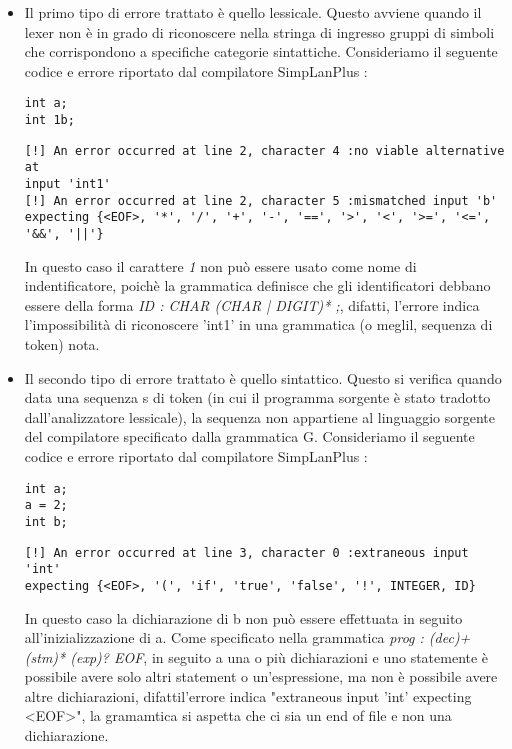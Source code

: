 \begin{itemize}
\item Il primo tipo di errore trattato è quello lessicale. Questo avviene quando il lexer non è in grado di riconoscere nella stringa di ingresso gruppi di simboli che corrispondono a specifiche categorie sintattiche. Consideriamo il seguente codice e errore riportato dal compilatore SimpLanPlus :
\begin{verbatim}
int a;
int 1b;
\end{verbatim}
\begin{verbatim}
[!] An error occurred at line 2, character 4 :no viable alternative at
input 'int1'
[!] An error occurred at line 2, character 5 :mismatched input 'b' 
expecting {<EOF>, '*', '/', '+', '-', '==', '>', '<', '>=', '<=',
'&&', '||'}
\end{verbatim}

In questo caso il carattere \textit{1} non può essere usato come nome di indentificatore, poichè la grammatica definisce che gli identificatori debbano essere della forma \textit{ID : CHAR (CHAR | DIGIT)* ;}, difatti, l'errore indica l'impossibilità di riconoscere 'int1' in una grammatica (o meglil, sequenza di token) nota. 

\item Il secondo tipo di errore trattato è quello sintattico. Questo si verifica quando data una sequenza s di token (in cui il programma sorgente è stato tradotto dall’analizzatore lessicale), la sequenza non appartiene al linguaggio sorgente del compilatore specificato dalla grammatica G. Consideriamo il seguente codice e errore riportato dal compilatore SimpLanPlus :

\begin{verbatim}
int a;
a = 2;
int b;
\end{verbatim}
\begin{verbatim}
[!] An error occurred at line 3, character 0 :extraneous input 'int' 
expecting {<EOF>, '(', 'if', 'true', 'false', '!', INTEGER, ID}
\end{verbatim}
In questo caso la dichiarazione di b non può essere effettuata in seguito all'inizializzazione di a. Come specificato nella grammatica \textit{prog : (dec)+ (stm)* (exp)? EOF}, in seguito a una o più dichiarazioni e uno statemente è possibile avere solo altri statement o un'espressione, ma non è possibile avere altre dichiarazioni, difattil'errore indica "extraneous input 'int' 
expecting <EOF>", la gramamtica si aspetta che ci sia un end of file e non una dichiarazione. 


\end{itemize}
